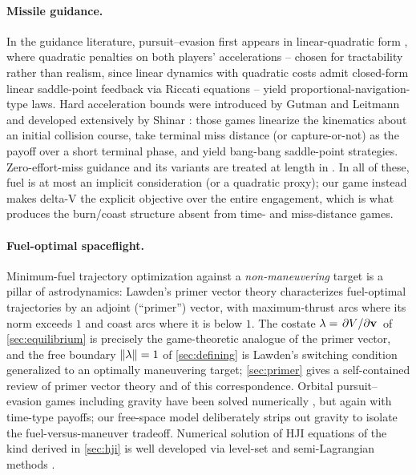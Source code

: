 \documentclass{article}
\renewcommand{\vec}[1]{\mathbf{#1}}
\theoremstyle{remark}
\begin{document}
\paragraph{Missile guidance.}
In the guidance literature, pursuit--evasion first appears in
linear-quadratic form \cite{ho1965}, where quadratic penalties on both
players' accelerations -- chosen for tractability rather than realism, since
linear dynamics with quadratic costs admit closed-form linear saddle-point
feedback via Riccati equations -- yield proportional-navigation-type laws.
Hard acceleration bounds were introduced by Gutman and Leitmann
\cite{gutmanleitmann1976} and developed extensively by Shinar
\cite{shinar1981}: those games linearize the kinematics about an initial
collision course, take terminal miss distance (or capture-or-not) as the
payoff over a short terminal phase, and yield bang-bang saddle-point
strategies.  Zero-effort-miss guidance and its variants are treated at
length in \cite{zarchan2012}.  In all of these, fuel is at most an implicit
consideration (or a quadratic proxy); our game instead makes delta-V the
explicit objective over the entire engagement, which is what produces the
burn/coast structure absent from time- and miss-distance games.

\paragraph{Fuel-optimal spaceflight.}
Minimum-fuel trajectory optimization against a \emph{non-maneuvering} target
is a pillar of astrodynamics: Lawden's primer vector theory \cite{lawden1963}
characterizes fuel-optimal trajectories by an adjoint (``primer'') vector,
with maximum-thrust arcs where its norm exceeds $1$ and coast arcs where it
is below $1$.  The costate $\vec\lambda = \pdv*{V}{\vec v}$ of
\cref{sec:equilibrium} is precisely the game-theoretic analogue of the
primer vector, and the free boundary $\norm{\vec\lambda} = 1$ of
\cref{sec:defining} is Lawden's switching condition generalized to an
optimally maneuvering target; \cref{sec:primer} gives a self-contained
review of primer vector theory and of this correspondence.  Orbital
pursuit--evasion games including gravity have been solved numerically
\cite{pontani2009}, but again with time-type payoffs; our free-space model
deliberately strips out gravity to isolate the fuel-versus-maneuver
tradeoff.  Numerical solution of HJI equations of the kind derived in
\cref{sec:hji} is well developed via level-set and semi-Lagrangian methods
\cite{mitchell2005,bardi1997}.
\end{document}
